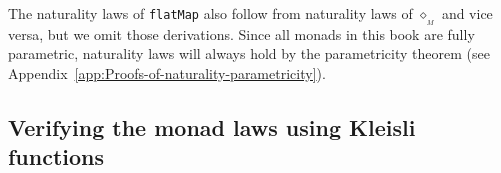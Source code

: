 \begin{comment}
Require two additional laws that connect $\diamond$, $\text{fmap}$,
and $\bef$:

Right naturality: $f^{A\rightarrow S^{B}}\bef\text{fmap}\,g^{B\rightarrow C}=f\diamond\left(g\bef\text{pure}\right)$

So, can define fmap through Kleisli: $\text{fmap}\,g^{A\rightarrow B}\equiv\text{id}^{S^{A}\rightarrow S^{A}}\diamond\left(g\bef\text{pure}\right)$

The laws for pure and flatMap then follow from category axioms for
Kleisli:

Left and right identity laws follow from $\text{id}\diamond\text{pure}=\text{id}$
and $\text{pure}\diamond f=f$ 

Associativity for flatMap follows from $\left(\text{id}\diamond f\right)\diamond g=\text{id}\diamond\left(f\diamond g\right)$

Use \textsf{``}left naturality\textsf{''}, get: $\left(f\bef g\right)\diamond h=\left(f\bef pure\right)\diamond g\diamond h=f\bef\left(g\diamond h\right)$

Naturality for pure: $\text{pure}\bef\text{fmap}\,f=\text{pure}\diamond\left(f\bef\text{pure}\right)=f\bef\text{pure}$

Define flatten: $\text{ftn}=\text{id}^{S^{S^{A}}\rightarrow S^{S^{A}}}\diamond\text{id}^{S^{A}\rightarrow S^{A}}$

Naturality for flatten: $\text{ftn}\bef\text{fmap}\,f=\text{id}\diamond\text{id}\diamond\left(f\bef\text{pure}\right)=\text{id}\diamond\text{fmap}\,f$
and $\text{fmap}\left(\text{fmap}\,f\right)\bef\text{ftn}=\text{id}\diamond\left(\left(\text{fmap}\,f\right)\bef\text{pure}\right)\bef\text{id}\diamond\text{id}=\text{id}\diamond\text{fmap}\,f$
\end{comment}

The naturality laws of \lstinline!flatMap! also follow from naturality
laws of $\diamond_{_{M}}$ and vice versa, but we omit those derivations.
Since all monads in this book are fully parametric, naturality laws
will always hold by the parametricity theorem (see Appendix~\ref{app:Proofs-of-naturality-parametricity}).

\subsection{Verifying the monad laws using Kleisli functions}

